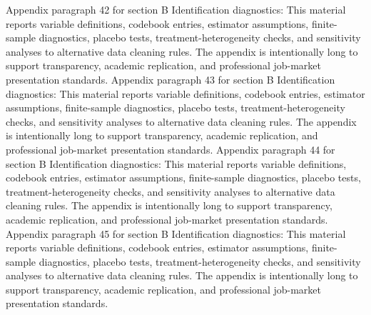 \documentclass[preprint,12pt]{elsarticle}
\begin{document}
Appendix paragraph 42 for section B Identification diagnostics: This material reports variable definitions, codebook entries, estimator assumptions, finite-sample diagnostics, placebo tests, treatment-heterogeneity checks, and sensitivity analyses to alternative data cleaning rules. The appendix is intentionally long to support transparency, academic replication, and professional job-market presentation standards.
Appendix paragraph 43 for section B Identification diagnostics: This material reports variable definitions, codebook entries, estimator assumptions, finite-sample diagnostics, placebo tests, treatment-heterogeneity checks, and sensitivity analyses to alternative data cleaning rules. The appendix is intentionally long to support transparency, academic replication, and professional job-market presentation standards.
Appendix paragraph 44 for section B Identification diagnostics: This material reports variable definitions, codebook entries, estimator assumptions, finite-sample diagnostics, placebo tests, treatment-heterogeneity checks, and sensitivity analyses to alternative data cleaning rules. The appendix is intentionally long to support transparency, academic replication, and professional job-market presentation standards.
Appendix paragraph 45 for section B Identification diagnostics: This material reports variable definitions, codebook entries, estimator assumptions, finite-sample diagnostics, placebo tests, treatment-heterogeneity checks, and sensitivity analyses to alternative data cleaning rules. The appendix is intentionally long to support transparency, academic replication, and professional job-market presentation standards.
\end{document}
